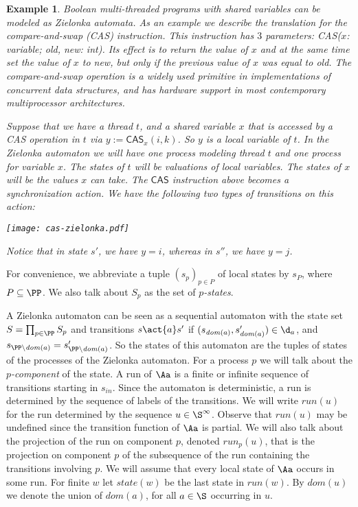 \documentclass[10pt,a4paper]{article}
\newtheorem{example}[theorem]{Example}
\newcommand{\CAS}{\textsf{CAS}}
\newcommand{\run}{\mathit{run}}
\newcommand{\state}{\mathit{state}}
\newcommand{\loc}{\mathit{dom}}
\begin{document}
\begin{example}\label{ex:cas}
  Boolean multi-threaded programs with shared
  variables can be modeled as Zielonka automata. As an example we
  describe the translation for the \emph{compare-and-swap} (CAS)
  instruction. This instruction has $3$ parameters: \textsf{CAS}($x$:
  variable; \emph{old}, \emph{new}: int). Its effect is to return the
  value of $x$ and at the same time set the value of $x$ to
  \emph{new}, but only if the previous value of $x$ was equal to
  \emph{old}. The compare-and-swap operation is a  widely used primitive
  in implementations of concurrent data structures, and has
  hardware support in most contemporary multiprocessor
  architectures.

  Suppose that we have a thread $t$, and a shared variable $x$ that is
  accessed by a CAS operation in $t$ via $y:=\CAS_x(i,k)$. So $y$ is a
  local variable of $t$. In the Zielonka automaton we will have one
  process modeling thread $t$ and one process for variable $x$. The
  states of $t$ will be valuations of local variables. The states of
  $x$ will be the values $x$ can take. The $\CAS$ instruction above
  becomes a synchronization action. We have the following two types of
  transitions on this action:
  \begin{center}
    \texttt{[image: cas-zielonka.pdf]}
  \end{center}
Notice that in state $s'$, we have $y=i$, whereas in $s''$, we have $y=j$.
\end{example}


For convenience, we abbreviate a tuple $(s_p)_{p \in P}$ of local
states by  $s_P$,  where $P \subseteq \PP$. We also talk about $S_p$
as the set of \emph{$p$-states}.

A Zielonka automaton can be seen as a sequential automaton with the
state set $S = \prod_{p\in\PP} S_p$ and transitions $s \act{a} s'$ if
$(s_{\loc(a)}, s'_{\loc(a)}) \in \d_a$, and $s_{\PP\setminus
  \loc(a)}=s'_{\PP\setminus \loc(a)}$. So the states of this automaton
are the tuples of states of the processes of the Zielonka
automaton. For a process $p$ we will talk about the
\emph{$p$-component} of the state.  A run of $\Aa$ is a finite or
infinite sequence of transitions starting in $s_{in}$. Since the
automaton is deterministic, a run is determined by the sequence of
labels of the transitions. We will write $\run(u)$ for the run
determined by the sequence $u\in \S^\infty$. Observe that $\run(u)$
may be undefined since the transition function of $\Aa$ is partial. We
will also talk about the projection of the run on component $p$,
denoted $\run_p(u)$, that is the projection on component $p$ of the
subsequence of the run containing the transitions involving $p$. We
will assume that every local state of $\Aa$ occurs in some run. For
finite $w$ let $\state(w)$ be the last state in $\run(w)$. By
$\loc(u)$ we denote the union of $\loc(a)$, for all $a \in\S$
occurring in $u$.
\end{document}
